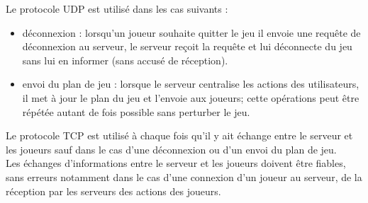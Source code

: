 \par
Le protocole UDP est utilisé dans les cas suivants :
\begin{itemize}
	\item déconnexion : lorsqu'un joueur souhaite quitter le jeu il envoie une requête de déconnexion au serveur, le serveur reçoit la requête et lui déconnecte du jeu sans lui en informer (sans accusé de réception).
	
	\item envoi du plan de jeu : lorsque le serveur centralise les actions des utilisateurs, il met à jour le plan du jeu et l'envoie aux joueurs; cette opérations peut être répétée autant de fois possible sans perturber le jeu.\\
\end{itemize}

\par
Le protocole TCP est utilisé à chaque fois qu'il y ait échange entre le serveur et les joueurs sauf dans le cas d'une déconnexion ou d'un envoi du plan de jeu.\\
Les échanges d'informations entre le serveur et les joueurs doivent être fiables, sans erreurs notamment dans le cas d'une connexion d'un joueur au serveur, de la réception par les serveurs des actions des joueurs.